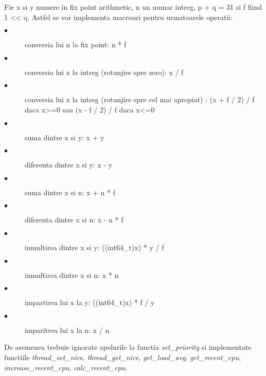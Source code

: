 \documentclass[a4paper,12pt]{report}
\begin{document}
Fie x si y numere in fix point arithmetic, n un numar intreg, p + q = 31 si f fiind 1 << q. Astfel se 
vor implementa macrouri pentru urmatoarele operatii:
\begin{description}
\item[$\bullet$] conversia lui n la fix point: n * f
\item[$\bullet$] conversia lui x la intreg (rotunjire spre zero): x / f
\item[$\bullet$] conversia lui x la intreg (rotunjire spre cel mai apropiat) : (x + f / 2) / f daca x>=0 sau (x - f / 2) / f daca x<=0
\item[$\bullet$] suma dintre x si y: x + y
\item[$\bullet$] diferenta dintre x si y: x - y
\item[$\bullet$] suma dintre x si n: x + n * f
\item[$\bullet$] diferenta dintre x si n: x - n * f
\item[$\bullet$] inmultirea dintre x si y: ((int64\_t)x) * y / f
\item[$\bullet$] inmultirea dintre x si n: x * n
\item[$\bullet$] impartirea lui x la y: ((int64\_t)x) * f / y
\item[$\bullet$] imparitrea lui x la n: x / n
\end{description}

De asemenea trebuie ignorate apelurile la functia \textit{set\_priority} si implementate functiile 
\textit{thread\_set\_nice}, \textit{thread\_get\_nice}, \textit{get\_load\_avg}, \textit{get\_recent\_cpu}, \textit{increase\_recent\_cpu}, \textit{calc\_recent\_cpu}.
\end{document}

